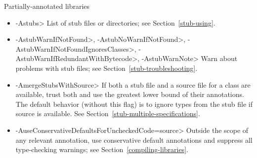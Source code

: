 Partially-annotated libraries
\begin{itemize}


\item \<-Astubs>
  List of stub files or directories; see Section~\ref{stub-using}.

\item
  \<-AstubWarnIfNotFound>,
  \<-AstubNoWarnIfNotFound>,
  \<-AstubWarnIfNotFoundIgnoresClasses>,
  \<-AstubWarnIfRedundantWithBytecode>,
  \<-AstubWarnNote>
  Warn about problems with stub files; see Section~\ref{stub-troubleshooting}.

\item \<-AmergeStubsWithSource>
  If both a stub file and a source file for a class are available, trust
  both and use the greatest lower bound of their annotations. The default
  behavior (without this flag) is to ignore types from the stub file if
  source is available. See Section~\ref{stub-multiple-specifications}.

\item \<-AuseConservativeDefaultsForUncheckedCode=source>
  Outside the scope of any relevant
   annotation, use conservative
  default annotations and suppress all type-checking warnings; see
  Section~\ref{compiling-libraries}.

\end{itemize}

